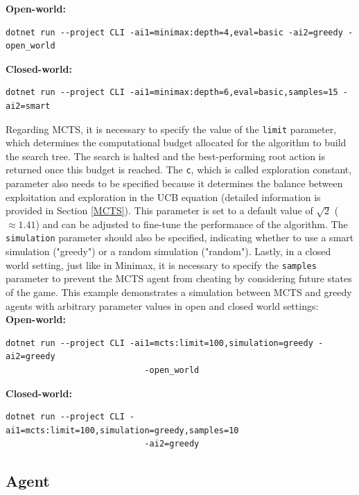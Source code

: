 \textbf{Open-world: }
\begin{lstlisting}[frame=single]
dotnet run --project CLI -ai1=minimax:depth=4,eval=basic -ai2=greedy -open_world
\end{lstlisting}

\textbf{Closed-world: }
\begin{lstlisting}[frame=single]
dotnet run --project CLI -ai1=minimax:depth=6,eval=basic,samples=15 -ai2=smart
\end{lstlisting}

Regarding MCTS, it is necessary to specify the value of the \texttt{limit} parameter, which determines the computational budget allocated for the algorithm to build the search tree. The search is halted and the best-performing root action is returned once this budget is reached. The \texttt{c}, which is called exploration constant, parameter also needs to be specified because it determines the balance between exploitation and exploration in the UCB equation (detailed information is provided in Section \ref{MCTS}). This parameter is set to a default value of  $\sqrt{2}$ ($\approx 1.41$) and can be adjusted to fine-tune the performance of the algorithm. The \texttt{simulation} parameter should also be specified, indicating whether to use a smart simulation ("greedy") or a random simulation ("random"). Lastly, in a closed world setting, just like in Minimax, it is necessary to specify the \texttt{samples} parameter to prevent the MCTS agent from cheating by considering future states of the game. This example demonstrates a simulation between MCTS and greedy agents with arbitrary parameter values in open and closed world settings: \\

\textbf{Open-world: }
\begin{lstlisting}[frame=single]
dotnet run --project CLI -ai1=mcts:limit=100,simulation=greedy -ai2=greedy 
							-open_world
\end{lstlisting}

\textbf{Closed-world: }
\begin{lstlisting}[frame=single]
dotnet run --project CLI -ai1=mcts:limit=100,simulation=greedy,samples=10 
							-ai2=greedy
\end{lstlisting}



\subsection{Agent}

